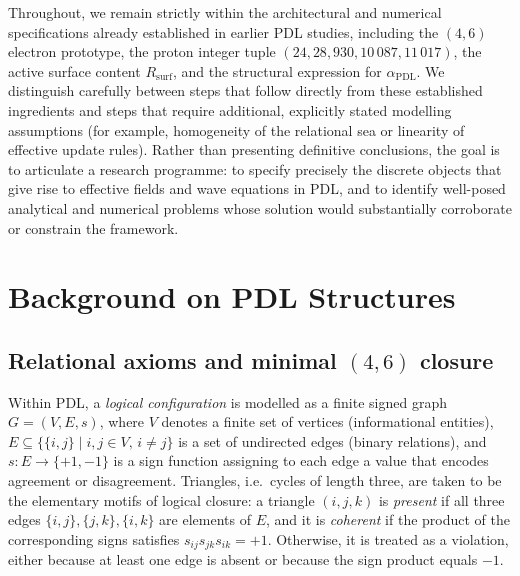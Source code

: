 \documentclass[11pt,a4paper]{article}
\begin{document}
Throughout, we remain strictly within the architectural and numerical specifications already established in earlier PDL studies, including the $(4,6)$ electron prototype, the proton integer tuple $(24,28,930,10\,087,11\,017)$, the active surface content $R_{\mathrm{surf}}$, and the structural expression for $\alpha_{\mathrm{PDL}}$.\cite{Laubscher2026FullPDL,Laubscher2026CombinatorialProton,Laubscher2026Alpha}
We distinguish carefully between steps that follow directly from these established ingredients and steps that require additional, explicitly stated modelling assumptions (for example, homogeneity of the relational sea or linearity of effective update rules).
Rather than presenting definitive conclusions, the goal is to articulate a research programme: to specify precisely the discrete objects that give rise to effective fields and wave equations in PDL, and to identify well-posed analytical and numerical problems whose solution would substantially corroborate or constrain the framework.

\section{Background on PDL Structures}

\subsection{Relational axioms and minimal \texorpdfstring{$(4,6)$}{(4,6)} closure}

Within PDL, a \emph{logical configuration} is modelled as a finite signed graph $G=(V,E,s)$, where $V$ denotes a finite set of vertices (informational entities), $E\subseteq \{\{i,j\}\mid i,j\in V,\,i\neq j\}$ is a set of undirected edges (binary relations), and $s:E\to\{+1,-1\}$ is a sign function assigning to each edge a value that encodes agreement or disagreement.\cite{Laubscher2026IntroPDL,Laubscher2026FullPDL}
Triangles, i.e.\ cycles of length three, are taken to be the elementary motifs of logical closure: a triangle $(i,j,k)$ is \emph{present} if all three edges $\{i,j\},\{j,k\},\{i,k\}$ are elements of $E$, and it is \emph{coherent} if the product of the corresponding signs satisfies $s_{ij}s_{jk}s_{ik}=+1$.
Otherwise, it is treated as a violation, either because at least one edge is absent or because the sign product equals $-1$.\cite{Laubscher2026IntroPDL}
\end{document}
